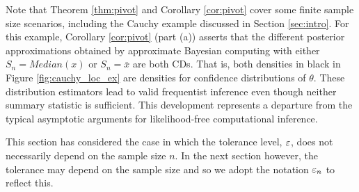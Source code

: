 	
Note that Theorem \ref{thm:pivot} and Corollary \ref{cor:pivot} cover some finite sample size scenarios, including the Cauchy example discussed in Section \ref{sec:intro}. For this example, Corollary \ref{cor:pivot} (part (a)) asserts that the different posterior approximations obtained by approximate Bayesian computing with either $S_n = Median(x)$ or $S_n = \bar{x}$ %
are both CDs. 
That is, both densities in black in Figure \ref{fig:cauchy_loc_ex} are densities for confidence distributions of $\theta$. These distribution estimators  lead to valid frequentist inference 
even though neither summary statistic is sufficient. This development represents a departure from the typical asymptotic arguments for likelihood-free computational inference. 
	
	
This section has considered the case in which the tolerance level, $\varepsilon$, does not necessarily depend on the sample size $n$. In the next section however, the tolerance may depend on the sample size and so we adopt the notation $\varepsilon_n$ to reflect this.
	
